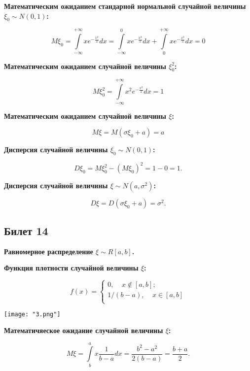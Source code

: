 \textbf{Математическим ожиданием стандарной нормальной
случайной величины $\xi_0 \sim N(0, 1)$:}
\smallskip     

\[
    M\xi_0 = \int\limits^{+\infty}_{-\infty} x e^{-\frac{x^2}{2}} dx =
    \int\limits^0_{-\infty} x e^{-\frac{x^2}{2}} dx +
    \int\limits^{+\infty}_{0} x e^{-\frac{x^2}{2}} dx = 0
\]
\bigskip

\textbf{Математическим ожиданием случайной величины $\xi_0^2$:}
\smallskip     

\[
    M\xi_0^2 = \int\limits^{+\infty}_{-\infty} x^2 e^{-\frac{x^2}{2}} dx = 1
\]
\bigskip

\textbf{Математическим ожиданием случайной величины $\xi$:}
\smallskip     

\[
    M\xi = M(\sigma \xi_0 + a) = a
\]
\bigskip    

\textbf{Дисперсия случайной величины $\xi_0 \sim N(0, 1)$:}  
\smallskip

\[
    D\xi_0 = M\xi^2_0 - (M\xi_0)^2 = 1 - 0 = 1.  
\]

\textbf{Дисперсия случайной величины $\xi \sim N(a,
\sigma^2)$:}  
\smallskip

\[
    D\xi = D(\sigma\xi_0 + a) = \sigma^2.  
\]  
\bigskip

\subsection{Билет 14}

\textbf{Равномерное распределение $\xi \sim R[a, b]$.}
\bigskip

\textbf{Функция плотности случайной величины $\xi$:}
\smallskip

\begin{equation*}
    f(x)=
    \begin{cases}
        0, \;\;\;\; x \notin [a, b];\\
        1/(b - a), \;\;\;\; x \in [a, b]\\
    \end{cases}
\end{equation*}

\begin{center}
    \texttt{[image: "3.png"]}
\end{center}
\bigskip

\textbf{Математичяеское ожидание случайной величины $\xi$:}
\smallskip

\[
    M\xi = \int\limits^a_b x \frac{1}{b - a}dx = \frac{b^2 - a^2}{2(b - a)}=
    \frac{b + a}{2}.  
\]
\bigskip

